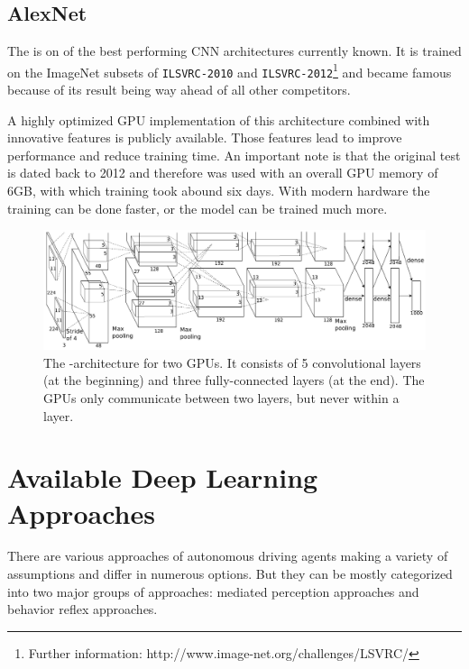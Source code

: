 \subsection{AlexNet} \label{subsec: AlexNet}

The \textit{\alexnet} is on of the best performing CNN architectures currently known. It is trained on the ImageNet subsets of \texttt{ILSVRC-2010} and \texttt{ILSVRC-2012}\footnote{Further information: http://www.image-net.org/challenges/LSVRC/} and became famous because of its result being way ahead of all other competitors.

A highly optimized GPU implementation of this architecture combined with innovative features is publicly available. Those features lead to improve performance and reduce training time.
An important note is that the original test is dated back to 2012 and therefore was used with an overall GPU memory of 6GB, with which training took abound six days. With modern hardware the training can be done faster, or the model can be trained much more. \cite{krizhevsky2012imagenet}


\begin{figure}[ht]
	\includegraphics[scale = 0.5]{src/pic/AlexNet-structure.PNG}
	\caption{The \alexnet-architecture for two GPUs. It consists of 5 convolutional layers (at the beginning) and three fully-connected layers (at the end). The GPUs only communicate between two layers, but never within a layer.\cite{krizhevsky2012imagenet}}
	\label{pic: AlexNet}
\end{figure}

\section{Available Deep Learning Approaches}\label{sec: Deep Learning Approaches}

There are various approaches of autonomous driving agents making a variety of assumptions and differ in numerous options. But they can be mostly categorized into two major groups of approaches: mediated perception approaches and behavior reflex approaches. \cite{chen2015deepdriving}

